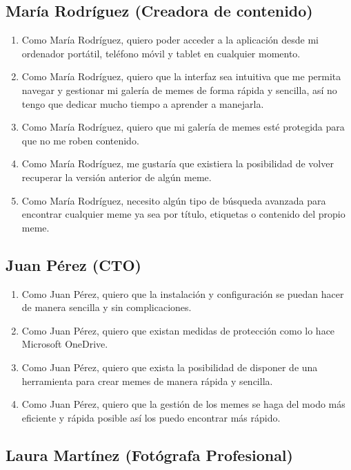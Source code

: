 \subsection{María Rodríguez (Creadora de contenido)}

\begin{enumerate}
    \item Como María Rodríguez, quiero poder acceder a la aplicación desde mi ordenador portátil, teléfono móvil y tablet en cualquier momento.
    \item Como María Rodríguez, quiero que la interfaz sea intuitiva que me permita navegar y gestionar mi galería de memes de forma rápida y sencilla, así no tengo que dedicar mucho tiempo a aprender a manejarla.
    \item Como María Rodríguez, quiero que mi galería de memes esté protegida para que no me roben contenido.
    \item Como María Rodríguez, me gustaría que existiera la posibilidad de volver recuperar la versión anterior de algún meme.
    \item Como María Rodríguez, necesito algún tipo de búsqueda avanzada para encontrar cualquier meme ya sea por título, etiquetas o contenido del propio meme.
\end{enumerate}

\subsection{Juan Pérez (CTO)}

    \begin{enumerate}
        \item Como Juan Pérez, quiero que la instalación y configuración se puedan hacer de manera sencilla y sin complicaciones.
        \item Como Juan Pérez, quiero que existan medidas de protección como lo hace Microsoft OneDrive.
        \item Como Juan Pérez, quiero que exista la posibilidad de disponer de una herramienta para crear memes de manera rápida y sencilla.
        \item Como Juan Pérez, quiero que la gestión de los memes se haga del modo más eficiente y rápida posible así los puedo encontrar más rápido.
    \end{enumerate}

\subsection{Laura Martínez (Fotógrafa Profesional)}

